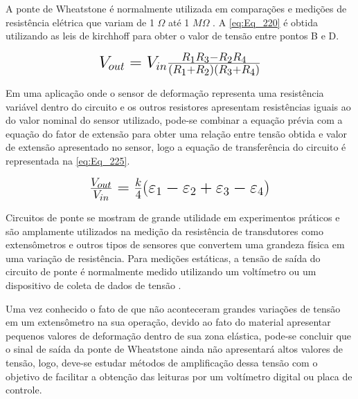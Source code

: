 A ponte de Wheatstone é normalmente utilizada em comparações e medições de resistência elétrica que variam de 1 $\Omega$ até 1 $M\Omega$ \autocite{Hollman2011}.
A \autoref{eq:Eq_220} é obtida utilizando as leis de kirchhoff para obter o valor de tensão entre pontos B e D.

\begin{equation}\label{eq:Eq_220}%
\mbox{\fontsize{17.28}{21.6}\selectfont\( %
V_{out} = V_{in} \frac{R_1 R_3 - R_2 R_4}{(R_1 + R_2)(R_3 + R_4)}
\)} %
\end{equation}

%
%
%

\hfill

Em uma aplicação onde o sensor de deformação representa uma resistência variável dentro do circuito e os outros resistores apresentam resistências
iguais ao do valor nominal do sensor utilizado, pode-se combinar a equação prévia com a equação do fator de extensão para obter uma relação entre tensão obtida
e valor de extensão apresentado no sensor, logo a equação de transferência do circuito é representada na \autoref{eq:Eq_225}.

\begin{equation}\label{eq:Eq_225}%
\mbox{\fontsize{17.28}{21.6}\selectfont\( %
\frac{V_{out}}{V_{in}} = \frac{k}{4}(\varepsilon_1 - \varepsilon_2 + \varepsilon_3 - \varepsilon_4)
\)} %
\end{equation}

%
%
%
%

\hfill

Circuitos de ponte se mostram de grande utilidade em experimentos práticos e são amplamente utilizados na medição da resistência de transdutores como extensômetros
e outros tipos de sensores que convertem uma grandeza física em uma variação de resistência. Para medições estáticas, a tensão de saída do circuito de ponte é normalmente
medido utilizando um voltímetro ou um dispositivo de coleta de dados de tensão \autocite{Hollman2011}.

Uma vez conhecido o fato de que não aconteceram grandes variações de tensão em um extensômetro na sua operação, devido ao fato do material apresentar pequenos valores de
deformação dentro de sua zona elástica, pode-se concluir que o sinal de saída da ponte de Wheatstone ainda não apresentará altos valores de tensão, logo, deve-se estudar métodos de
amplificação dessa tensão com o objetivo de facilitar a obtenção das leituras por um voltímetro digital ou placa de controle.

